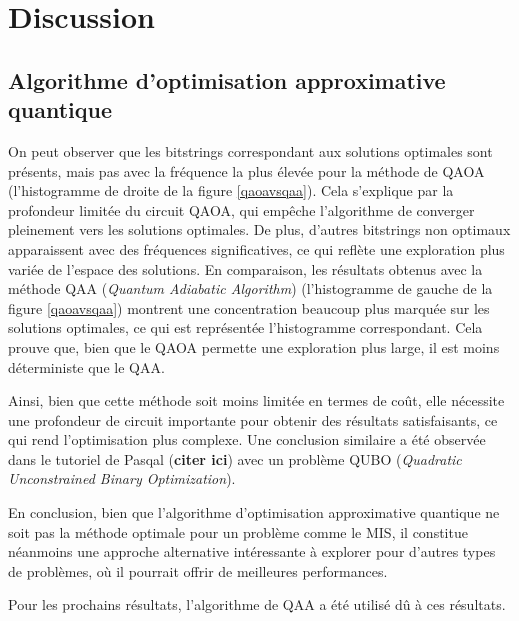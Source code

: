 \documentclass[11pt]{article}
\begin{document}
\section{Discussion}

\subsection{Algorithme d'optimisation approximative quantique}

 On peut observer que les bitstrings correspondant aux solutions optimales sont présents, mais pas avec la fréquence la plus élevée pour la méthode de QAOA (l'histogramme de droite de la figure \ref{qaoavsqaa}). Cela s'explique par la profondeur limitée du circuit QAOA, qui empêche l'algorithme de converger pleinement vers les solutions optimales. De plus, d'autres bitstrings non optimaux apparaissent avec des fréquences significatives, ce qui reflète une exploration plus variée de l'espace des solutions.
En comparaison, les résultats obtenus avec la méthode QAA (\textit{Quantum Adiabatic Algorithm}) (l'histogramme de gauche de la figure \ref{qaoavsqaa}) montrent une concentration beaucoup plus marquée sur les solutions optimales, ce qui est représentée l'histogramme correspondant. Cela prouve que, bien que le QAOA permette une exploration plus large, il est moins déterministe que le QAA.




Ainsi, bien que cette méthode soit moins limitée en termes de coût, elle nécessite une profondeur de circuit importante pour obtenir des résultats satisfaisants, ce qui rend l'optimisation plus complexe. Une conclusion similaire a été observée dans le tutoriel de Pasqal (\textbf{citer ici}) avec un problème QUBO (\textit{Quadratic Unconstrained Binary Optimization}).

En conclusion, bien que l'algorithme d'optimisation approximative quantique ne soit pas la méthode optimale pour un problème comme le MIS, il constitue néanmoins une approche alternative intéressante à explorer pour d'autres types de problèmes, où il pourrait offrir de meilleures performances.

Pour les prochains résultats, l'algorithme de QAA a été utilisé dû à ces résultats.
\end{document}
